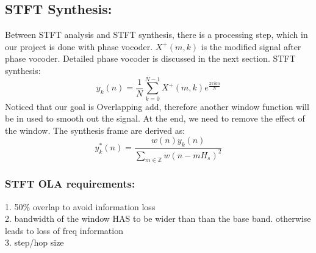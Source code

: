 \documentclass{article}
\begin{document}
\subsection{STFT Synthesis:}
Between STFT analysis and STFT synthesis, there is a processing step, which in our project is done with phase vocoder. $X^{+}(m,k)$ is the modified signal after phase vocoder. Detailed phase vocoder is discussed in the next section. 
STFT synthesis: 
\begin{equation}
        y_k(n) = \frac{1}{N}\sum_{k=0}^{N-1} X^{+}(m,k) e^{\frac{2\pi i k n}{N}} 
\end{equation}
Noticed that our goal is Overlapping add, therefore another window function will be in used to smooth out the signal. At the end, we need to remove the effect of the window. The synthesis frame are derived as:
\begin{equation}
        y^{*}_k(n) = \frac{w(n)y_k(n)}{\sum_{m\in \mathbb{Z}}w(n-mH_s)^2}
\end{equation}
\subsubsection*{STFT OLA requirements:}
1. 50\% overlap to avoid information loss\\
2. bandwidth of the window HAS to be wider than than the base band. otherwise leads to loss of freq information\\
3. step/hop size
\end{document}
